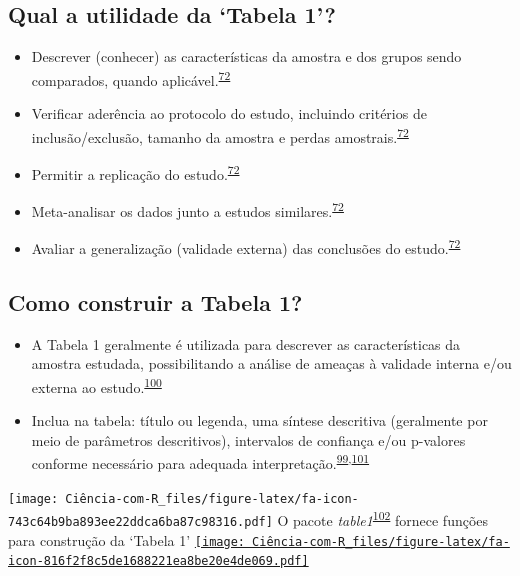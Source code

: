 \documentclass[
]{book}
\begin{document}
\hypertarget{qual-a-utilidade-da-tabela-1}{%
\subsection{Qual a utilidade da `Tabela 1'?}\label{qual-a-utilidade-da-tabela-1}}

\begin{itemize}
\item
  Descrever (conhecer) as características da amostra e dos grupos sendo comparados, quando aplicável.\textsuperscript{\protect\hyperlink{ref-chen2020}{72}}
\item
  Verificar aderência ao protocolo do estudo, incluindo critérios de inclusão/exclusão, tamanho da amostra e perdas amostrais.\textsuperscript{\protect\hyperlink{ref-chen2020}{72}}
\item
  Permitir a replicação do estudo.\textsuperscript{\protect\hyperlink{ref-chen2020}{72}}
\item
  Meta-analisar os dados junto a estudos similares.\textsuperscript{\protect\hyperlink{ref-chen2020}{72}}
\item
  Avaliar a generalização (validade externa) das conclusões do estudo.\textsuperscript{\protect\hyperlink{ref-chen2020}{72}}
\end{itemize}

\hypertarget{como-construir-a-tabela-1}{%
\subsection{Como construir a Tabela 1?}\label{como-construir-a-tabela-1}}

\begin{itemize}
\item
  A Tabela 1 geralmente é utilizada para descrever as características da amostra estudada, possibilitando a análise de ameaças à validade interna e/ou externa ao estudo.\textsuperscript{\protect\hyperlink{ref-Hayes-Larson2019}{100}}
\item
  Inclua na tabela: título ou legenda, uma síntese descritiva (geralmente por meio de parâmetros descritivos), intervalos de confiança e/ou p-valores conforme necessário para adequada interpretação.\textsuperscript{\protect\hyperlink{ref-Inskip2017}{99},\protect\hyperlink{ref-Kwak2021}{101}}
\end{itemize}

\texttt{[image: Ciência-com-R\_files/figure-latex/fa-icon-743c64b9ba893ee22ddca6ba87c98316.pdf]} O pacote \emph{table1}\textsuperscript{\protect\hyperlink{ref-table1}{102}} fornece funções para construção da `Tabela 1' \href{https://cran.r-project.org/web/packages/table1/index.html}{\texttt{[image: Ciência-com-R\_files/figure-latex/fa-icon-816f2f8c5de1688221ea8be20e4de069.pdf]}}
\end{document}
